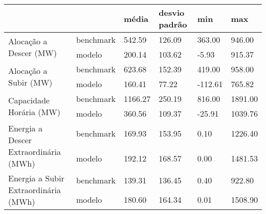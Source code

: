 \begin{tabular}{llllll}
\toprule
 &  & média & desvio padrão & min & max \\
\midrule
\multirow[t]{2}{*}{Alocação a Descer (MW)} & benchmark & 542.59 & 126.09 & 363.00 & 946.00 \\
 & modelo & 200.14 & 103.62 & -5.93 & 915.37 \\
\cline{1-6}
\multirow[t]{2}{*}{Alocação a Subir (MW)} & benchmark & 623.68 & 152.39 & 419.00 & 958.00 \\
 & modelo & 160.41 & 77.22 & -112.61 & 765.82 \\
\cline{1-6}
\multirow[t]{2}{*}{Capacidade Horária (MW)} & benchmark & 1166.27 & 250.19 & 816.00 & 1891.00 \\
 & modelo & 360.56 & 109.37 & -25.91 & 1039.76 \\
\cline{1-6}
\multirow[t]{2}{*}{Energia a Descer Extraordinária (MWh)} & benchmark & 169.93 & 153.95 & 0.10 & 1226.40 \\
 & modelo & 192.12 & 168.57 & 0.00 & 1481.53 \\
\cline{1-6}
\multirow[t]{2}{*}{Energia a Subir Extraordinária (MWh)} & benchmark & 139.31 & 136.45 & 0.40 & 922.80 \\
 & modelo & 180.60 & 164.34 & 0.01 & 1508.90 \\
\cline{1-6}
\bottomrule
\end{tabular}
